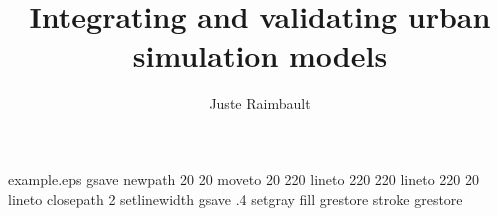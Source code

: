 %
%
%
%
%
\begin{filecontents*}{example.eps}
gsave
newpath
  20 20 moveto
  20 220 lineto
  220 220 lineto
  220 20 lineto
closepath
2 setlinewidth
gsave
  .4 setgray fill
grestore
stroke
grestore
\end{filecontents*}
%
\RequirePackage{fix-cm}
%
\documentclass[smallextended]{svjour3}       %
%
\smartqed  %
%
\usepackage{graphicx}
%
%
%
%
%


\title{Integrating and validating urban simulation models}
\subtitle{}


\author{Juste Raimbault}



\date{}


